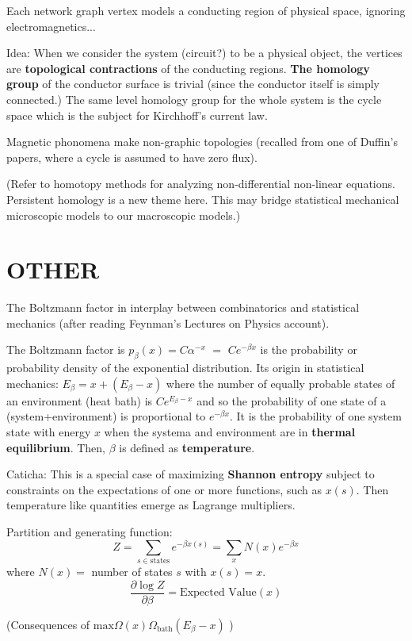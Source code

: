\documentclass{article}
\begin{document}
Each network graph vertex models a conducting region of physical space, 
ignoring electromagnetics...

Idea: When we consider the system (circuit?) to be a physical object, the 
vertices are \textbf{topological contractions} of the conducting regions.
\textbf{The homology group} of the conductor surface is trivial (since the
conductor itself is simply connected.)   The same level homology group for 
the whole system is the cycle space which is the subject for Kirchhoff's 
current law.

Magnetic phonomena make non-graphic topologies (recalled from one of 
Duffin's papers, where a cycle is assumed to have zero flux).

(Refer to homotopy methods for analyzing non-differential non-linear 
equations.  Persistent homology is a new theme here.  This may bridge
statistical mechanical microscopic models to our macroscopic models.)

\section{OTHER}

The Boltzmann factor in interplay between combinatorics and statistical
mechanics (after reading Feynman's Lectures on Physics account).

The Boltzmann factor is 
$p_{\beta}(x)= C\alpha^{-x}$ $=$ $Ce^{-\beta x}$ is the probability 
or probability density of the exponential distribution.
Its origin in statistical mechanics:  $E_\beta = x + (E_\beta-x)$ where the 
number of equally probable states of an environment (heat bath) 
is $Ce^{E_\beta - x}$ and so the probability of one state of a 
(system+environment) is proportional to $e^{-\beta x}$.  It is the probability
of one system state with energy $x$ when the systema and environment are
in \textbf{thermal equilibrium}.  Then, $\beta$ is defined as 
\textbf{temperature}.

Caticha: This is a special case of maximizing \textbf{Shannon entropy}
subject to constraints on the expectations of one or more functions, such as 
$x(s)$.  Then temperature like quantities emerge as Lagrange multipliers.

Partition and generating function:
\[
Z = \sum_{s\in\text{states}}e^{-\beta x(s)} = \sum_{x}N(x)e^{-\beta x} 
\]
where $N(x)= $ number of states $s$ with $x(s) = x$.
\[
\frac{\partial{\log Z}}{\partial\beta}
=
\text{Expected Value}(x)
\]

(Consequences of $\text{max}\Omega(x)\Omega_{\text{bath}}(E_\beta -x )$
\cite{CatichaEIFP})
\end{document}
